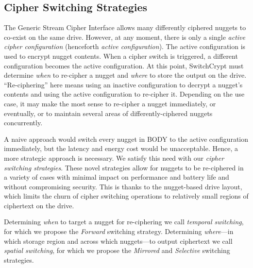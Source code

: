 
\subsection{Cipher Switching Strategies} \label{subsec:strategies}

The Generic Stream Cipher Interface allows many differently ciphered nuggets to
co-exist on the same drive. However, at any moment, there is only a single
\emph{active cipher configuration} (henceforth \emph{active configuration}). The
active configuration is used to encrypt nugget contents. When a cipher switch is
triggered, a different configuration becomes the active configuration. At this
point, SwitchCrypt must determine \emph{when} to re-cipher a nugget and
\emph{where} to store the output on the drive. ``Re-ciphering'' here means using
an inactive configuration to decrypt a nugget's contents and using the active
configuration to re-cipher it. Depending on the use case, it may make the most
sense to re-cipher a nugget immediately, or eventually, or to maintain several
areas of differently-ciphered nuggets concurrently.

A naive approach would switch every nugget in BODY to the active configuration
immediately, but the latency and energy cost would be unacceptable. Hence, a
more strategic approach is necessary. We satisfy this need with our \emph{cipher
switching strategies}. These novel strategies allow for nuggets to be
re-ciphered in a variety of cases with minimal impact on performance and battery
life and without compromising security. This is thanks to the nugget-based drive
layout, which limits the churn of cipher switching operations to relatively
small regions of ciphertext on the drive.

Determining \emph{when} to target a nugget for re-ciphering we call
\emph{temporal switching}, for which we propose the \emph{Forward} switching
strategy. Determining \emph{where}---in which storage region and across which
nuggets---to output ciphertext we call \emph{spatial switching}, for which we
propose the \emph{Mirrored} and \emph{Selective} switching strategies.

